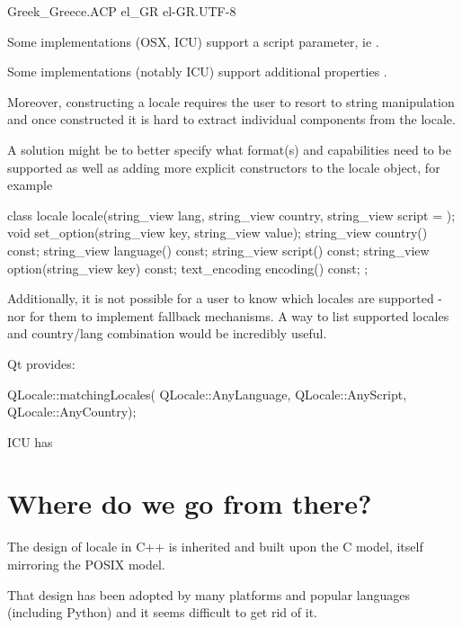 \documentclass{wg21}
\begin{document}
\begin{codeblock}
Greek_Greece.ACP
el_GR
el-GR.UTF-8
\end{codeblock}

Some implementations (OSX, ICU) support a script parameter, ie .

Some implementations (notably ICU) support additional properties .


Moreover, constructing a locale requires the user to resort to string manipulation and once constructed it is hard to extract individual components from the locale.

A solution might be to better specify what format(s) and capabilities need to be supported as well as adding more explicit constructors to the locale object, for example


\begin{codeblock}

class locale {
    locale(string_view lang, string_view country, string_view script = {});
    void set_option(string_view key, string_view value);
    string_view country() const;
    string_view language() const;
    string_view script() const;
    string_view option(string_view key) const;
    text_encoding encoding() const;
};

\end{codeblock}

Additionally, it is not possible for a user to know which locales are supported - nor for them to implement fallback mechanisms.
A way to list supported locales and country/lang combination would be incredibly useful. 

Qt provides:

\begin{codeblock}
    QLocale::matchingLocales( QLocale::AnyLanguage, QLocale::AnyScript, QLocale::AnyCountry);
\end{codeblock}

ICU has 


\section{Where do we go from there?}

The design of locale in C++ is inherited and built upon the C model, itself mirroring the POSIX model.

That design has been adopted by many platforms and popular languages (including Python) and it seems difficult to get rid of it.
\end{document}
